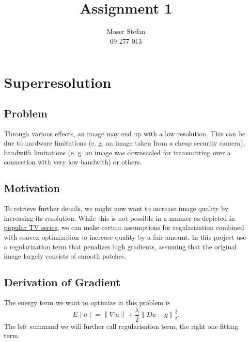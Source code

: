 \documentclass{paper}
\title{Assignment 1}
\author{Moser Stefan\\09-277-013}
\newcommand{\norm}[1]{\left\lVert#1\right\rVert}
\begin{document}
\maketitle


%

\section*{Superresolution}

\subsection*{Problem}
Through various effects, an image may end up with a low resolution. 
This can be due to hardware limitations 
(e. g. an image taken from a cheap security camera), 
bandwith limitations 
(e. g. an image was downscaled for transmitting over a connection with very low bandwith) or others.  


\subsection*{Motivation}
To retrieve further details, we might now want to increase image quality by increasing its resolution. 
While this is not possible in a manner as depicted in \href{http://petapixel.com/2012/08/17/ridiculous-photo-enhancement-scene-from-the-tv-show-csi/}{popular TV series}, 
we can make certain assumptions for regularization combined with convex optimization to increase quality by a fair amount. 
In this project use a regularization term that penalizes high gradients,
assuming that the original image largely consists of smooth patches.

\subsection*{Derivation of Gradient}

The energy term we want to optimize in this problem is 
\begin{equation}
E(u) = \norm{\nabla u} + \frac{\lambda}{2} \norm{Du - g}^2_2.
\end{equation}
The left summand we will further call regularisation term, 
the right one fitting term. 
\end{document}
